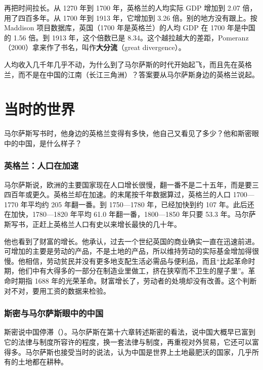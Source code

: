 再把时间拉长。从 1270 年到 1700 年，英格兰的人均实际 GDP 增加到 2.07 倍，用了四百多年。从 1700 年到 1913 年，它增加到 3.26 倍\cite{boe2017,broadberry2015}。别的地方没有跟上。按 Maddison 项目数据库，英国（1700 年是英格兰）的人均 GDP 在 1700 年是中国的 1.56 倍。到 1913 年，这个倍数已是 8.34\cite{mpd2023}。这个越拉越大的差距，Pomeranz（2000）拿来作了书名，叫作\textbf{大分流}（great divergence）\cite{pomeranz2000}。

人均收入几千年几乎不动，为什么到了马尔萨斯的时代开始起飞，而且先在英格兰，而不是在中国的江南（长江三角洲）？答案要从马尔萨斯身边的英格兰说起。

\section{当时的世界}\label{sec:divergence-world}

马尔萨斯写书时，他身边的英格兰变得有多快，他自己又看见了多少？他和斯密眼中的中国，是什么样子？

\subsubsection{英格兰：人口在加速}
马尔萨斯说，欧洲的主要国家现在人口增长很慢，翻一番不是二十五年，而是要三四百年或更久\cite{malthus1798}。英格兰却在加速。的末尾按千年数据算过，英格兰的人口 1700—1770 年平均约 205 年翻一番。到 1750—1780 年，已经加快到约 107 年。此后还在加快，1780—1820 年平均 61.0 年翻一番，1800—1850 年只要 53.3 年\cite{boe2017,broadberry2015}。马尔萨斯写书，正赶上英格兰人口有史以来增长最快的几十年。

他也看到了财富的增长。他承认，过去一个世纪英国的商业确实一直在迅速前进。可增加的主要是劳动的产品，不是土地的产品，所以维持劳动的实际基金增加得很慢\cite{malthus1798}。他相信，劳动贫民并没有更多地支配生活必需品与便利品，而且“比起革命时期，他们中有大得多的一部分在制造业里做工，挤在狭窄而不卫生的屋子里”\cite{malthus1798}。革命时期指 1688 年的光荣革命。财富增长了，劳动者的处境却没有改善。这个判断对不对，要用工资的数据来检验。

\subsubsection{斯密与马尔萨斯眼中的中国}
斯密说中国停滞（）。马尔萨斯在第十六章转述斯密的看法，说中国大概早已富到它的法律与制度所容许的程度，换一套法律与制度，再重视对外贸易，它还可以富得多\cite{malthus1798}。马尔萨斯也接受当时的说法，认为中国是世界上土地最肥沃的国家，几乎所有的土地都在耕种\cite{malthus1798}。

